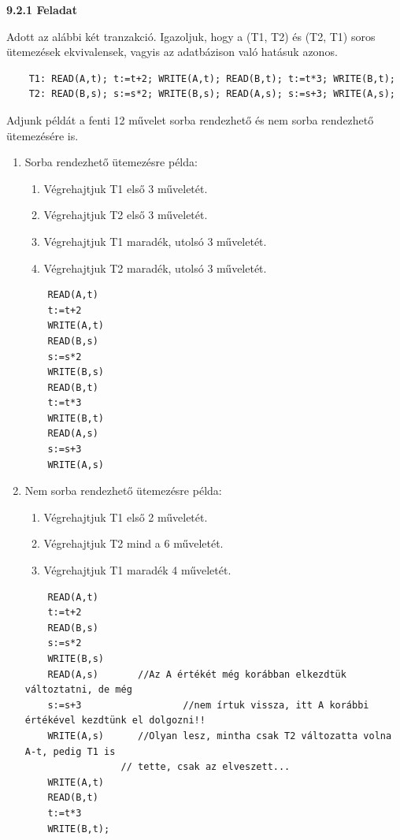 \documentclass[a4paper,11.5pt, table]{article}
\begin{document}
	{\large \textbf{9.2.1 Feladat}}
	
	Adott az alábbi két tranzakció. Igazoljuk, hogy a (T1, T2) és (T2, T1) soros ütemezések ekvivalensek, vagyis az adatbázison való hatásuk azonos.
	\begin{lstlisting}
	T1: READ(A,t); t:=t+2; WRITE(A,t); READ(B,t); t:=t*3; WRITE(B,t);
	T2: READ(B,s); s:=s*2; WRITE(B,s); READ(A,s); s:=s+3; WRITE(A,s);
	\end{lstlisting}
	Adjunk példát a fenti 12 művelet sorba rendezhető és nem sorba rendezhető ütemezésére is.
	\begin{enumerate}[label = \alph*)]
		\item Sorba rendezhető ütemezésre példa:
		\begin{enumerate}
			\item Végrehajtjuk T1 első 3 műveletét.
			\item Végrehajtjuk T2 első 3 műveletét.
			\item Végrehajtjuk T1 maradék, utolsó 3 műveletét.
			\item Végrehajtjuk T2 maradék, utolsó 3 műveletét.
		\end{enumerate}
		
		\begin{lstlisting}
	READ(A,t) 
	t:=t+2
	WRITE(A,t)
	READ(B,s)
	s:=s*2
	WRITE(B,s)
	READ(B,t)
	t:=t*3
	WRITE(B,t)
	READ(A,s)
	s:=s+3
	WRITE(A,s)
		\end{lstlisting}
	
	
		\item Nem sorba rendezhető ütemezésre példa:
		\begin{enumerate}
			\item Végrehajtjuk T1 első 2 műveletét.
			\item Végrehajtjuk T2 mind a 6 műveletét.
			\item Végrehajtjuk T1 maradék 4 műveletét.
		\end{enumerate}
		\begin{lstlisting}
	READ(A,t)  
	t:=t+2
	READ(B,s)
	s:=s*2
	WRITE(B,s)
	READ(A,s) 		//Az A értékét még korábban elkezdtük változtatni, de még 
	s:=s+3 					//nem írtuk vissza, itt A korábbi értékével kezdtünk el dolgozni!!
	WRITE(A,s)		//Olyan lesz, mintha csak T2 változatta volna A-t, pedig T1 is
				 //	tette, csak az elveszett...
	WRITE(A,t)
	READ(B,t)
	t:=t*3
	WRITE(B,t);
		\end{lstlisting}
	\end{enumerate} 
\end{document}
